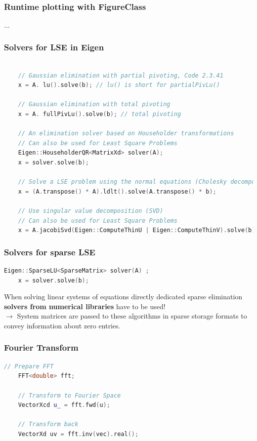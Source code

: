 \documentclass[12pt, a4paper]{article}
\begin{document}
\subsubsection{Runtime plotting with FigureClass}
...

\subsubsection{Solvers for LSE in Eigen }
	\begin{lstlisting}[language=C++]
	
	// Gaussian elimination with partial pivoting, Code 2.3.41
	x = A. lu().solve(b); // lu() is short for partialPivLu()
	
	// Gaussian elimination with total pivoting
	x = A. fullPivLu().solve(b); // total pivoting
	
	// An elimination solver based on Householder transformations
	// Can also be used for Least Square Problems	
	Eigen::HouseholderQR<MatrixXd> solver(A);
	x = solver.solve(b);	
	
	// Solve a LSE problem using the normal equations (Cholesky decomposition)
	x = (A.transpose() * A).ldlt().solve(A.transpose() * b);
	
	// Use singular value decomposition (SVD)
	// Can also be used for Least Square Problems	
	x = A.jacobiSvd(Eigen::ComputeThinU | Eigen::ComputeThinV).solve(b);	
\end{lstlisting}


\subsubsection{Solvers for sparse LSE}
\begin{lstlisting}[language=C++]
	Eigen::SparseLU<SparseMatrix> solver(A) ;
	x = solver.solve(b);
\end{lstlisting}

\begin{tcolorbox}
	When solving linear systems of equations directly dedicated sparse elimination \textbf{solvers from numerical libraries} have to be used! \\
	
	$\rightarrow$ System matrices are passed to these algorithms in sparse storage formats to convey information about zero entries.	
\end{tcolorbox}

\subsubsection{Fourier Transform}
\begin{lstlisting}[language=C++]
	// Prepare FFT
	FFT<double> fft;
	
	// Transform to Fourier Space
	VectorXcd u_ = fft.fwd(u);
	
	// Transform back
	VectorXd uv = fft.inv(vec).real();
\end{lstlisting}
\end{document}
